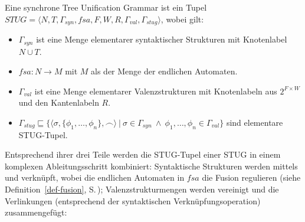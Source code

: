 \begin{definition} Eine synchrone Tree Unification Grammar ist ein Tupel
$STUG = \langle N,T, \Gamma_{\!\mathit{syn}}, \mathit{fsa} ,F ,W ,R ,\Gamma_{\!\mathit{val}}, \Gamma_{\!\mathit{stug}} \rangle$, wobei gilt:
\begin{itemize}
  \item $\Gamma_{\!\mathit{syn}}$ ist eine Menge elementarer syntaktischer Strukturen mit Knotenlabel $N \cup T$.
  \item $\mathit{fsa}: N \to M$ mit $M$ als der Menge der endlichen Automaten.
  \item $\Gamma_{\!\mathit{val}}$ ist eine Menge elementarer Valenzstrukturen mit Knotenlabeln aus $2^{F \times W}$ und den Kantenlabeln $R$.
  \item $\Gamma_{\!\mathit{stug}} \sqsubseteq \{\langle \sigma,\{\phi_1,\ldots,\phi_n\}, \frown\rangle \ | \ \sigma \in \Gamma_{\!\mathit{syn}} \ \wedge \ \phi_1,\ldots,\phi_n \in \Gamma_{\!\mathit{val}}\}$ sind elementare STUG-Tupel.  
\end{itemize}
\end{definition}
Entsprechend ihrer drei Teile werden die STUG-Tupel einer STUG in einem komplexen Ableitungsschritt kombiniert: Syntaktische Strukturen werden mittels  und  verknüpft, wobei die endlichen Automaten in $\mathit{fsa}$ die Fusion regulieren (siehe Definition~\ref{def-fusion}, S.\,\pageref{def-fusion}); Valenzstrukturmengen werden vereinigt und die Verlinkungen (entsprechend der syntaktischen Verknüpfungsoperation) zusammengefügt:

